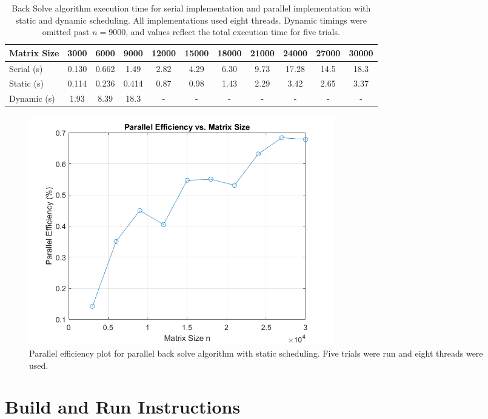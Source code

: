 \documentclass{article}
\begin{document}
\begin{table}[h!]
\centering
\begin{tabular}{@{}lcccccccccc@{}}
\toprule
Matrix Size & 3000 & 6000 & 9000 & 12000 & 15000 & 18000 & 21000 & 24000 & 27000 & 30000 \\
\midrule
Serial (s) & 0.130 & 0.662 & 1.49 & 2.82 & 4.29 & 6.30 & 9.73 & 17.28 & 14.5 & 18.3 \\
Static (s) & 0.114 & 0.236 & 0.414 & 0.87 & 0.98 & 1.43 & 2.29 & 3.42 & 2.65 & 3.37 \\
Dynamic (s) & 1.93 & 8.39 & 18.3 & - & - & - & - & - & - & - \\
\bottomrule
\end{tabular}
\caption{Back Solve algorithm execution time for serial implementation and parallel implementation with static and dynamic scheduling. All implementations used eight threads. Dynamic timings were omitted past $n = 9000$, and values reflect the total execution time for five trials.}
\label{tab:back_solve_times}
\end{table}


\FloatBarrier
\begin{figure}
    \centering
    \includegraphics[height=10cm]{part_2_parr_eff.png}
    \caption{Parallel efficiency plot for parallel back solve algorithm with static scheduling. Five trials were run and eight threads were used.}
    \label{fig:enter-label}
\end{figure}
\FloatBarrier

\section{Build and Run Instructions}
\end{document}
